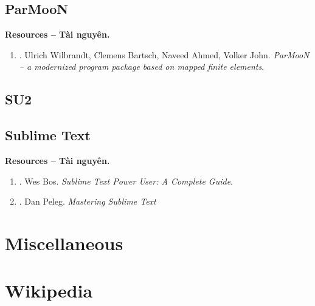 \documentclass{article}
\begin{document}
\subsection{ParMooN}
\textbf{\textsf{Resources -- Tài nguyên.}}
\begin{enumerate}
	\item \cite{ParMooN2017}. {\sc Ulrich Wilbrandt, Clemens Bartsch, Naveed Ahmed, Volker John}. {\it ParMooN -- a modernized program package based on mapped finite elements}.
\end{enumerate}

\subsection{SU2}

\subsection{Sublime Text}
\textbf{\textsf{Resources -- Tài nguyên.}}
\begin{enumerate}
	\item \cite{Bos2014}. {\sc Wes Bos}. {\it Sublime Text Power User: A Complete Guide}.
	\item \cite{Peleg2014}. {\sc Dan Peleg}. {\it Mastering Sublime Text}
\end{enumerate}


\section{Miscellaneous}



\section{Wikipedia}
\end{document}
